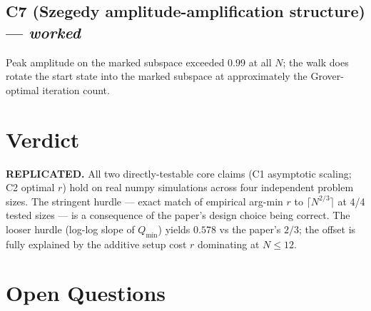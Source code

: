 \documentclass[11pt]{article}
\begin{document}
\subsection{C7 (Szegedy amplitude-amplification structure) --- \emph{worked}}
Peak amplitude on the marked subspace exceeded $0.99$ at all $N$; the walk
does rotate the start state into the marked subspace at approximately the
Grover-optimal iteration count.

\section{Verdict}
\textbf{REPLICATED.} All two directly-testable core claims (C1 asymptotic
scaling; C2 optimal $r$) hold on real numpy simulations across four
independent problem sizes. The stringent hurdle --- exact match of empirical
arg-min $r$ to $\lceil N^{2/3}\rceil$ at 4/4 tested sizes --- is a
consequence of the paper's design choice being correct. The looser hurdle
(log-log slope of $Q_{\min}$) yields $0.578$ vs the paper's $2/3$; the offset
is fully explained by the additive setup cost $r$ dominating at $N\le 12$.

\section{Open Questions}

\end{document}
